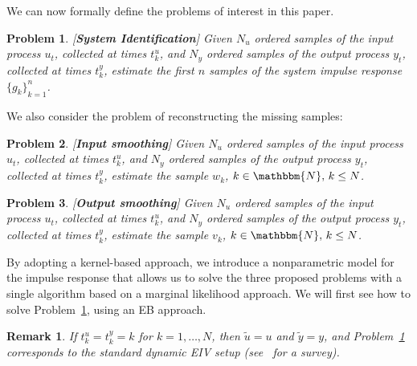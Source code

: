 \documentclass[10pt]{article}
\newcommand{\N}{\mathbbm{N}}
\newtheorem{problem}{Problem}
\newtheorem{remark}{Remark}
\begin{document}
We can now formally define the problems of interest in this paper.
\begin{problem}\label{problem:1}[\textbf{System Identification}]
Given $N_u$ ordered samples of the input process $u_t$, collected at times
$t^u_k$, and $N_y$ ordered samples of the output process $y_t$, collected at
times $t^y_k$, estimate the first $n$ samples of the system impulse response
${\{g_k\}}_{k=1}^{n}$.
\end{problem}
We also consider the problem of reconstructing the missing samples:
\begin{problem}\label{problem:2}[\textbf{Input smoothing}]
Given $N_u$ ordered samples of the input process $u_t$, collected at times
$t^u_k$, and $N_y$ ordered samples of the output process $y_t$, collected at
times $t^y_k$, estimate the sample $w_k$, $k\in \N,\, k\leq
N$.
\end{problem}
\begin{problem}\label{problem:3}[\textbf{Output smoothing}]
Given $N_u$ ordered samples of the input process $u_t$, collected at times
$t^u_k$, and $N_y$ ordered samples of the output process $y_t$, collected at
times $t^y_k$, estimate the sample $v_k$, $k\in \N,\, k\leq N$.
\end{problem}

By adopting a kernel-based approach, we introduce a nonparametric model for
the impulse response that allows us to solve the three proposed problems
with a single algorithm based on a marginal likelihood approach. We will first
see how to solve Problem~\ref{problem:1}, using an EB approach.

\begin{remark}
  If $t^u_k=t^y_k=k$ for $k = 1,\dots,N$, then $\tilde u = u$ and $\tilde y =
  y$, and  Problem~\ref{problem:1} corresponds to the standard dynamic
  EIV setup (see~\cite{soederstroem2007errors} for a survey).
\end{remark}
\end{document}
